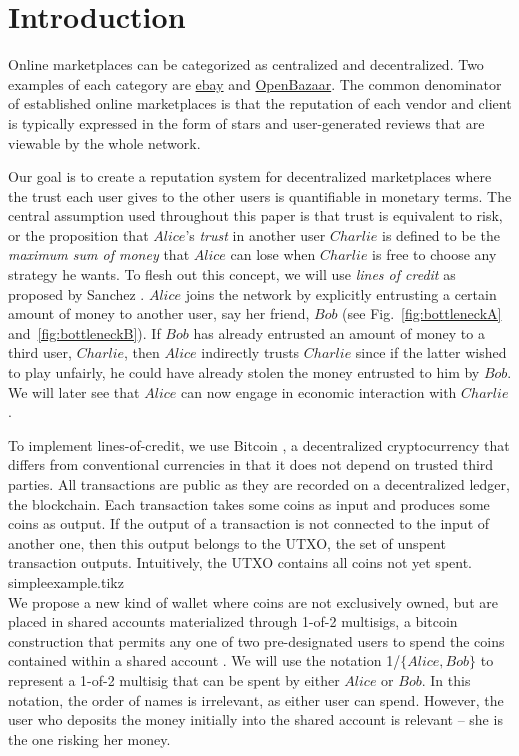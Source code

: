 \section{Introduction}
  Online marketplaces can be categorized as centralized and decentralized.
  Two examples of each category are \href{http://www.ebay.com}{ebay} and \href{https://openbazaar.org/}{OpenBazaar}.
  The common denominator of established online marketplaces is that the reputation of each vendor and client is typically
  expressed in the form of stars and user-generated reviews that are viewable by the whole network.

  Our goal is to create a reputation system for decentralized marketplaces where the trust each user gives to the other users
  is quantifiable in monetary terms. The central assumption used throughout this paper is that trust is equivalent to risk, or
  the proposition that $Alice$'s \textit{trust} in another user $Charlie$ is defined to be the \textit{maximum sum of money}
  that $Alice$ can lose when $Charlie$ is free to choose any strategy he wants. To flesh out this concept, we will use
  \textit{lines of credit} as proposed by Sanchez \cite{loc}. $Alice$ joins the network by explicitly entrusting a certain
  amount of money to another user, say her friend, $Bob$ (see Fig.~\ref{fig:bottleneckA} and~\ref{fig:bottleneckB}). If $Bob$
  has already entrusted an amount of money to a third user, $Charlie$, then $Alice$ indirectly trusts $Charlie$ since if the
  latter wished to play unfairly, he could have already stolen the money entrusted to him by $Bob$. We will later see that
  $Alice$ can now engage in economic interaction with $Charlie$.

  To implement lines-of-credit, we use Bitcoin \cite{bitcoin}, a decentralized cryptocurrency that differs from conventional
  currencies in that it does not depend on trusted third parties. All transactions are public as they are recorded on a
  decentralized ledger, the blockchain. Each transaction takes some coins as input and produces some coins as output. If the
  output of a transaction is not connected to the input of another one, then this output belongs to the UTXO, the set of
  unspent transaction outputs. Intuitively, the UTXO contains all coins not yet spent.
  \medskip \ \\
  {simpleexample.tikz} \smallskip \ \\
  We propose a new kind of wallet where coins are not exclusively owned, but are placed in shared accounts materialized
  through 1-of-2 multisigs, a bitcoin construction that permits any one of two pre-designated users to spend the coins
  contained within a shared account \cite{masteringbitcoin}. We will use the notation 1/$\{Alice, Bob\}$ to represent a
  1-of-2 multisig that can be spent by either $Alice$ or $Bob$. In this notation, the order of names is irrelevant, as
  either user can spend. However, the user who deposits the money initially into the shared account is relevant -- she is the
  one risking her money.

